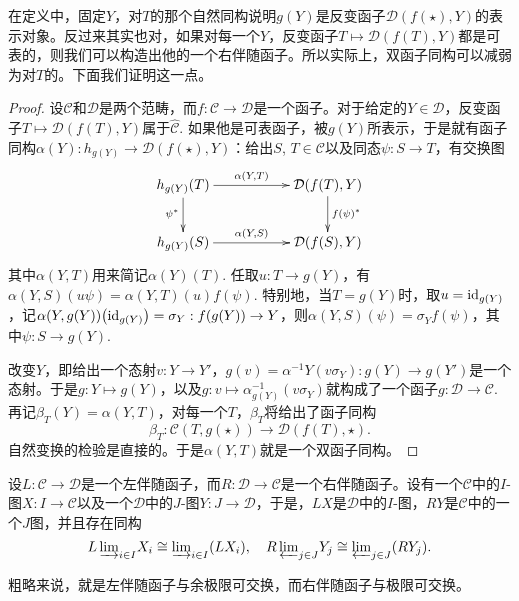 在定义中，固定$Y$，对$T$的那个自然同构说明$g(Y)$是反变函子$\mathcal{D}(f(\star),Y)$的表示对象。反过来其实也对，如果对每一个$Y$，反变函子$T\mapsto {\mathcal{D}}(f(T),Y)$都是可表的，则我们可以构造出他的一个右伴随函子。所以实际上，双函子同构可以减弱为对$T$的。下面我们证明这一点。

\begin{proof} 
	设$\mathcal{C}$和$\mathcal{D}$是两个范畴，而$f:\mathcal{C}\to \mathcal{D}$是一个函子。对于给定的$Y\in\mathcal{D}$，反变函子$T\mapsto {\mathcal{D}}(f(T),Y)$属于$\hat{\mathcal{C}}$. 如果他是可表函子，被$g(Y)$所表示，于是就有函子同构$\alpha(Y):h_{g(Y)}\to {\mathcal{D}}(f(\star),Y)$：给出$S$, $T\in \mathcal{C}$以及同态$\psi:S\to T$，有交换图
	\[
	\begin{xy}
		\xymatrix{
			h_{g(Y)}(T)\ar[rr]^-{\alpha(Y,T)} \ar[d]_{\psi^*}&&{\mathcal{D}}(f(T),Y) \ar[d]^{f(\psi)^*}\\
			h_{g(Y)}(S)\ar[rr]^-{\alpha(Y,S)}&&{\mathcal{D}}(f(S),Y)
		}
	\end{xy}
	\]
	其中$\alpha(Y,T)$用来简记$\alpha(Y)(T)$. 任取$u:T\to {g(Y)}$，有$\alpha(Y,S)(u\psi)=\alpha(Y,T)(u)f(\psi)$. 特别地，当$T=g(Y)$时，取$u=\operatorname{id}_{g(Y)}$，记$\alpha(Y,g(Y))\bigl(\operatorname{id}_{g(Y)}\bigr)=\sigma_Y:f(g(Y))\to Y$，则$\alpha(Y,S)(\psi)=\sigma_Y f(\psi)$，其中$\psi:S\to g(Y)$.

	改变$Y$，即给出一个态射$v:Y\to Y'$，$g(v)=\alpha^{-1}{Y}\left(v\sigma_Y\right):g(Y)\to g(Y')$是一个态射。于是$g:Y\mapsto g(Y)$，以及$g:v\mapsto \alpha^{-1}_{g(Y)}\left(v\sigma_Y\right)$就构成了一个函子$g:\mathcal{D}\to \mathcal{C}$. 再记$\beta_T(Y)=\alpha(Y,T)$，对每一个$T$，$\beta_T$将给出了函子同构
	\[
		\beta_T:\mathcal{C}(T,g(\star))\to \mathcal{D}(f(T),\star).
	\]
	自然变换的检验是直接的。于是$\alpha(Y,T)$就是一个双函子同构。
\end{proof}

\begin{pro}
设$L:\mathcal{C}\to \mathcal{D}$是一个左伴随函子，而$R:\mathcal{D}\to \mathcal{C}$是一个右伴随函子。设有一个$\mathcal{C}$中的$I$-图$X:I\to \mathcal{C}$以及一个$\mathcal{D}$中的$J$-图$Y:J\to \mathcal{D}$，于是，$LX$是$\mathcal{D}$中的$I$-图，$RY$是$\mathcal{C}$中的一个$J$图，并且存在同构
\[
	L\,{\varinjlim}_{i\in I} X_i\cong {\varinjlim}_{i\in I} (LX_i),\quad
	R\,{\varprojlim}_{j\in J} Y_j\cong {\varprojlim}_{j\in J} (RY_j).
\]
\end{pro}

粗略来说，就是左伴随函子与余极限可交换，而右伴随函子与极限可交换。

